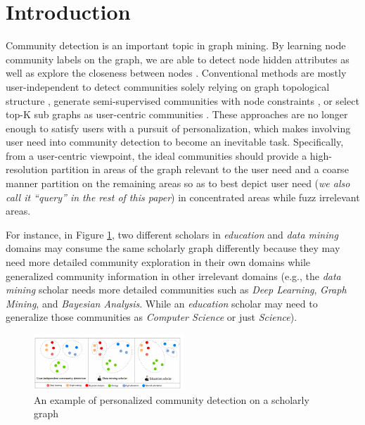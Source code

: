 \section{Introduction}
Community detection is an important topic in graph mining. By learning node community labels on the graph, we are able to detect node hidden attributes as well as explore the closeness between nodes \cite{fortunato2010community}. Conventional methods are mostly user-independent to detect communities solely relying on graph topological structure \cite{fortunato2016community}, generate semi-supervised communities with node constraints \cite{jin2019graph}, or select top-K sub graphs as user-centric communities \cite{li2015influential}. These approaches are no longer enough to satisfy users with a pursuit of personalization, which makes involving user need into community detection to become an inevitable task. Specifically, from a user-centric viewpoint, the ideal communities should provide a high-resolution partition in areas of the graph relevant to the user need and a coarse manner partition on the remaining areas so as to best depict user need (\textit{we also call it ``query'' in the rest of this paper}) in concentrated areas while fuzz irrelevant areas.  

For instance, in Figure \ref{fig:example}, two different scholars in \textit{education} and \textit{data mining} domains may consume the same scholarly graph differently because they may need more detailed community exploration in their own domains while generalized community information in other irrelevant domains (e.g., the \textit{data mining} scholar needs more detailed communities such as \textit{Deep Learning}, \textit{Graph Mining}, and \textit{Bayesian Analysis}.  While an \textit{education} scholar may need to generalize those communities as \textit{Computer Science} or just \textit{Science}). 

\begin{figure}
	\center
	\includegraphics[width=0.8\columnwidth]{img/chapter3/example.pdf} 
	\caption{An example of personalized community detection on a scholarly graph} 
	\label{fig:example}
\end{figure}  

